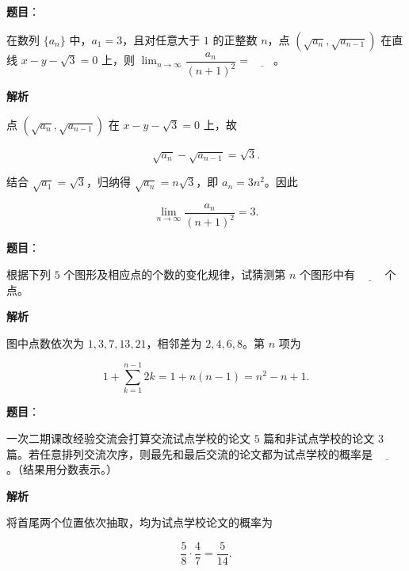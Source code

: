 \begin{answer}

\textbf{题目}：

在数列 $\{a_n\}$ 中，$a_1=3$，且对任意大于 $1$ 的正整数 $n$，点 $(\sqrt{a_n},\sqrt{a_{n-1}})$ 在直线 $x-y-\sqrt{3}=0$ 上，则 $\displaystyle\lim_{n\to\infty}\dfrac{a_n}{(n+1)^2}=\underline{\qquad}$。

\textbf{解析}

点 $(\sqrt{a_n},\sqrt{a_{n-1}})$ 在 $x-y-\sqrt3=0$ 上，故

\nopagebreak[4]
\[\sqrt{a_n}-\sqrt{a_{n-1}}=\sqrt3.\]

结合 $\sqrt{a_1}=\sqrt3$，归纳得 $\sqrt{a_n}=n\sqrt3$，即 $a_n=3n^2$。因此

\nopagebreak[4]
\[\lim_{n\to\infty}\frac{a_n}{(n+1)^2}=3.\]


\end{answer}
\begin{answer}

\textbf{题目}：

根据下列 $5$ 个图形及相应点的个数的变化规律，试猜测第 $n$ 个图形中有 $\underline{\qquad}$ 个点。
\nopagebreak[4]
\begin{center}\end{center}
\nopagebreak[4]
\textbf{解析}

图中点数依次为 $1,3,7,13,21$，相邻差为 $2,4,6,8$。第 $n$ 项为

\nopagebreak[4]
\[1+\sum_{k=1}^{n-1}2k=1+n(n-1)=n^2-n+1.\]


\end{answer}
\begin{answer}

\textbf{题目}：

一次二期课改经验交流会打算交流试点学校的论文 $5$ 篇和非试点学校的论文 $3$ 篇。若任意排列交流次序，则最先和最后交流的论文都为试点学校的概率是 $\underline{\qquad}$。（结果用分数表示。）

\textbf{解析}

将首尾两个位置依次抽取，均为试点学校论文的概率为

\nopagebreak[4]
\[\frac58\cdot\frac47=\frac5{14}.\]


\end{answer}
